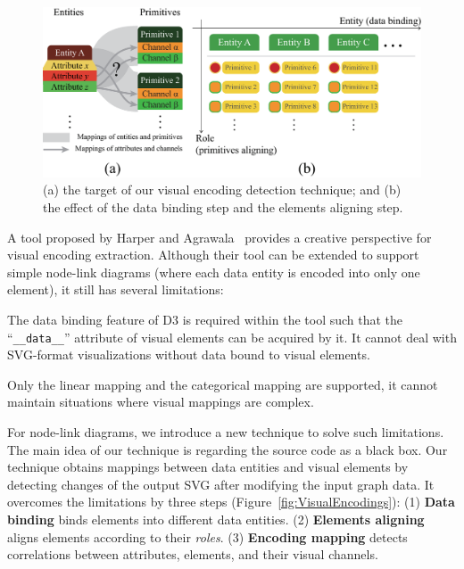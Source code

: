 \begin{figure}[ht]
    \centering
    \includegraphics[width=1\columnwidth]{figures/ElementAligning.eps}
    \caption{(a) the target of our visual encoding detection technique; and (b) the effect of the data binding step and the elements aligning step.}
    \label{fig:ElementAligning}
\end{figure}

A tool proposed by Harper and Agrawala~\cite{DBLP:conf/uist/HarperA14} provides a creative perspective for visual encoding extraction.
Although their tool can be extended to support simple node-link diagrams (where each data entity is encoded into only one element), it still has several limitations:
\begin{compactenum}
\item The data binding feature of D3 is required within the tool such that the ``\texttt{\_\_data\_\_}'' attribute of visual elements can be acquired by it. 
It cannot deal with SVG-format visualizations without data bound to visual elements.

\item Only the linear mapping and the categorical mapping are supported, it cannot maintain situations where visual mappings are complex.
\end{compactenum}

For node-link diagrams, we introduce a new technique to solve such limitations.
The main idea of our technique is regarding the source code as a black box.
Our technique obtains mappings between data entities and visual elements by detecting changes of the output SVG after modifying the input graph data.
It overcomes the limitations by three steps (Figure~\ref{fig:VisualEncodings}):
(1) \textbf{Data binding} binds elements into different data entities.
(2) \textbf{Elements aligning} aligns elements according to their \textit{roles}. 
(3) \textbf{Encoding mapping} detects correlations between attributes, elements, and their visual channels.

